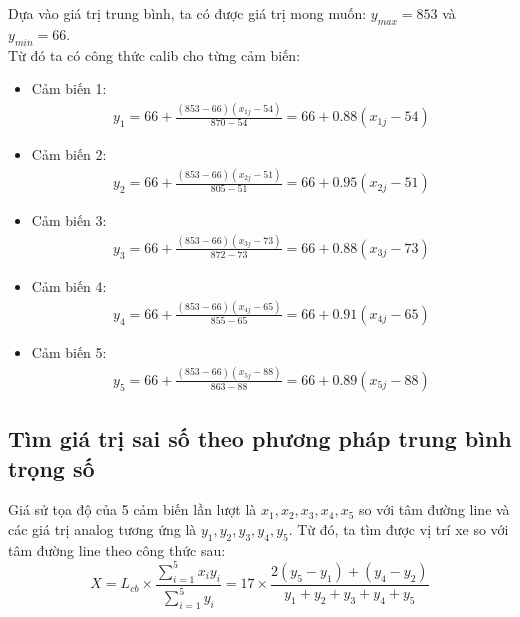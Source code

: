             \hspace*{0.6cm}Dựa vào giá trị trung bình, ta có được giá trị mong muốn: $y_{max} = 853$ và $y_{min} = 66$.\\
            \hspace*{0.6cm}Từ đó ta có công thức calib cho từng cảm biến:
            \begin{itemize}
                \item Cảm biến 1:
                \begin{align*}
                    y_1 = 66 + \frac{(853 - 66)(x_{1j} - 54)}{870 - 54} = 66 + 0.88(x_{1j} - 54)
                \end{align*}
                \item Cảm biến 2:
                \begin{align*}
                    y_2 = 66 + \frac{(853 - 66)(x_{2j} - 51)}{805 - 51} = 66 + 0.95(x_{2j} - 51)
                \end{align*}
                \item Cảm biến 3:
                \begin{align*}
                    y_3 = 66 + \frac{(853 - 66)(x_{3j} - 73)}{872 - 73} = 66 + 0.88(x_{3j} - 73)
                \end{align*}
                \item Cảm biến 4:
                \begin{align*}
                    y_4 = 66 + \frac{(853 - 66)(x_{4j} - 65)}{855 - 65} = 66 + 0.91(x_{4j} - 65)
                \end{align*}
                \item Cảm biến 5:
                \begin{align*}
                    y_5 = 66 + \frac{(853 - 66)(x_{5j} - 88)}{863 - 88} = 66 + 0.89(x_{5j} - 88)
                \end{align*}
            \end{itemize}
            \subsection{Tìm giá trị sai số theo phương pháp trung bình trọng số}
            \hspace*{0.6cm}Giá sử tọa độ của 5 cảm biến lần lượt là $x_1, x_2, x_3, x_4, x_5$ so với tâm đường line và các giá trị analog tương ứng là $y_1, y_2, y_3, y_4, y_5$. Từ đó, ta tìm được vị trí xe so với tâm đường line theo công thức sau:
            \begin{equation}
                X = L_{cb} \times \frac{\sum_{i=1}^{5} x_i y_i}{\sum_{i=1}^{5} y_i} = 17 \times \frac{2(y_5 - y_1) + (y_4 - y_2)}{y_1 + y_2 + y_3 + y_4 + y_5}
                \label{eq:4-7}
            \end{equation}

